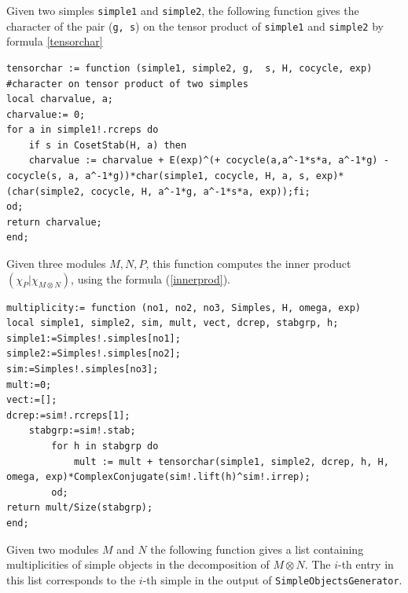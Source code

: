 \documentclass[11pt]{book}
\theoremstyle{Rem}
\theoremstyle{definition}
\numberwithin{equation}{section}
\newcommand\lstl{\lstinline}
\begin{document}
Given two simples \lstl{simple1} and \lstl{simple2}, the following function gives the character of the pair (\lstl{g, s}) on the tensor product of \lstl{simple1} and \lstl{simple2} by formula \ref{tensorchar}
\begin{lstlisting}
tensorchar := function (simple1, simple2, g,  s, H, cocycle, exp) #character on tensor product of two simples
local charvalue, a;
charvalue:= 0;
for a in simple1!.rcreps do
	if s in CosetStab(H, a) then
	charvalue := charvalue + E(exp)^(+ cocycle(a,a^-1*s*a, a^-1*g) - cocycle(s, a, a^-1*g))*char(simple1, cocycle, H, a, s, exp)*(char(simple2, cocycle, H, a^-1*g, a^-1*s*a, exp));fi;
od;
return charvalue;
end;

\end{lstlisting}
Given three modules $M, N, P$, this function computes the inner product $(\chi_P| \chi_{M\otimes N})$, using the formula (\ref{innerprod}).
\begin{lstlisting}
multiplicity:= function (no1, no2, no3, Simples, H, omega, exp)
local simple1, simple2, sim, mult, vect, dcrep, stabgrp, h;
simple1:=Simples!.simples[no1];
simple2:=Simples!.simples[no2];
sim:=Simples!.simples[no3];
mult:=0;
vect:=[];
dcrep:=sim!.rcreps[1];
	stabgrp:=sim!.stab;
		for h in stabgrp do
			mult := mult + tensorchar(simple1, simple2, dcrep, h, H, omega, exp)*ComplexConjugate(sim!.lift(h)^sim!.irrep);
		od;
return mult/Size(stabgrp);
end;
\end{lstlisting}
Given two modules $M$ and $N$ the following function gives a list containing multiplicities of simple objects in the decomposition of $M\otimes N$. The $i$-th entry in this list corresponds to the $i$-th simple in the output of \lstinline{SimpleObjectsGenerator}.
\end{document}
